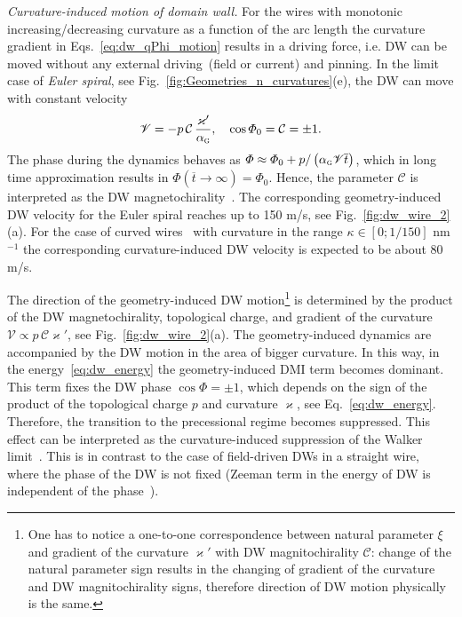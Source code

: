 {\it Curvature-induced motion of domain wall.} For the wires with monotonic increasing/decreasing curvature as a function of the arc length the curvature gradient in Eqs.~\eqref{eq:dw_qPhi_motion} results in a driving force, i.e. DW can be moved without any external driving~(field or current) and pinning. In the limit case of \textit{Euler spiral}, see Fig.~\ref{fig:Geometries_n_curvatures}(e), the DW can move with constant velocity
\begin{equation}\label{eq:velocity_euler_spiral}
\mathscr{V}=-p\,\mathcal{C}\,\frac{\varkappa'}{\alpha_\textsc{g}},\quad\cos\varPhi_0=\mathcal{C}=\pm1.
\end{equation}
The phase during the dynamics behaves as $\varPhi\approx\varPhi_0+p/\left(\alpha_\textsc{g} \mathscr{V} \overline{t}\right)$, which in long time approximation results in $\varPhi\left(\overline{t}\to\infty\right)=\varPhi_0$. Hence, the parameter $\mathcal{C}$ is interpreted as the DW magnetochirality~\cite{Kim14}.  The corresponding geometry-induced DW velocity for the Euler spiral reaches up to 150 m/s, see Fig.~\ref{fig:dw_wire_2}(a). For the case of curved wires~\cite{Lewis09,Nahrwold09,Wartelle18} with curvature in the range $\kappa\in\left[0;1/150\right]$ nm$^{-1}$ the corresponding curvature-induced DW velocity is expected to be about 80 m/s.

The direction of the geometry-induced DW motion\footnote{One has to notice a one-to-one correspondence between natural	parameter $\xi$ and gradient of the curvature $\varkappa'$ with DW magnitochirality $\mathcal{C}$: change of the natural parameter sign results in the changing of gradient of the curvature and DW magnitochirality	signs, therefore direction of DW motion physically is the same.} is determined by the product of the DW magnetochirality, topological charge, and gradient of the curvature $\mathscr{V}\propto p\,\mathcal{C}\varkappa'$, see Fig.~\ref{fig:dw_wire_2}(a). The geometry-induced dynamics are accompanied by the DW motion in the area of bigger curvature. In this way, in the energy~\eqref{eq:dw_energy} the geometry-induced DMI term becomes dominant. This term fixes the DW phase $\cos\varPhi=\pm1$, which depends on the sign of the product of the topological charge $p$ and curvature $\varkappa$, see Eq.~\eqref{eq:dw_energy}. Therefore, the transition to the precessional regime becomes suppressed. This effect can be interpreted as the curvature-induced suppression of the Walker limit~\cite{Yershov18a}. This is in contrast to the case of field-driven DWs in a straight wire, where the phase of the DW is not fixed (Zeeman term in the energy of DW is independent of the phase~\cite{Malozemoff79,Hillebrands06}).

